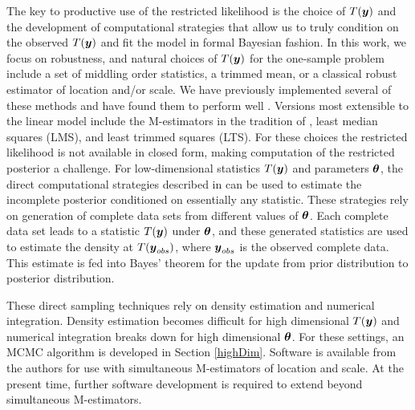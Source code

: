 \documentclass[12pt]{article}
\def\bth{\mbox{\boldmath $\theta$}}
\newcommand{\by}{\mbox{\boldmath $y$}}
\begin{document}
The key to productive use of the restricted likelihood is the choice of $T(\by)$ and the development
of computational strategies that allow us to truly condition on the observed $T(\by)$ and 
fit the model in formal Bayesian fashion.  In this work, we focus
on robustness, and natural choices of $T(\by)$ for the one-sample problem include a set of middling order statistics, a trimmed
mean, or a classical robust estimator of location and/or scale.  
We have previously implemented several of these methods and have found them to perform well \citep[][]{lewis2012}. Versions most extensible to the linear model include the M-estimators in the tradition of \cite{huber1964}, least median squares (LMS), and least trimmed squares (LTS). For these choices the restricted likelihood is not available in closed form, making computation of the restricted posterior a challenge. For low-dimensional statistics $T(\by)$ and parameters $\bth$, the direct computational strategies described in \cite{lewis2014} can be used to estimate the incomplete posterior conditioned on essentially any statistic.  These strategies rely on generation of complete data sets from different values of $\bth$.  
Each complete data set leads to a statistic $T(\by)$ under $\bth$, and these generated statistics are used to estimate the density at $T(\by_{obs})$, where $\by_{obs}$ is the observed complete data. This estimate is fed into Bayes' theorem for the update from prior distribution to posterior distribution.  %

These direct sampling techniques rely on density estimation and numerical integration. Density estimation becomes difficult for high dimensional $T(\by)$ and numerical integration breaks down for high dimensional $\bth$. For these settings, an MCMC algorithm is developed in Section \ref{highDim}. Software is available from the authors for use with simultaneous M-estimators of location and scale. At the present time, further software development is required to extend beyond simultaneous M-estimators.  

\end{document}
